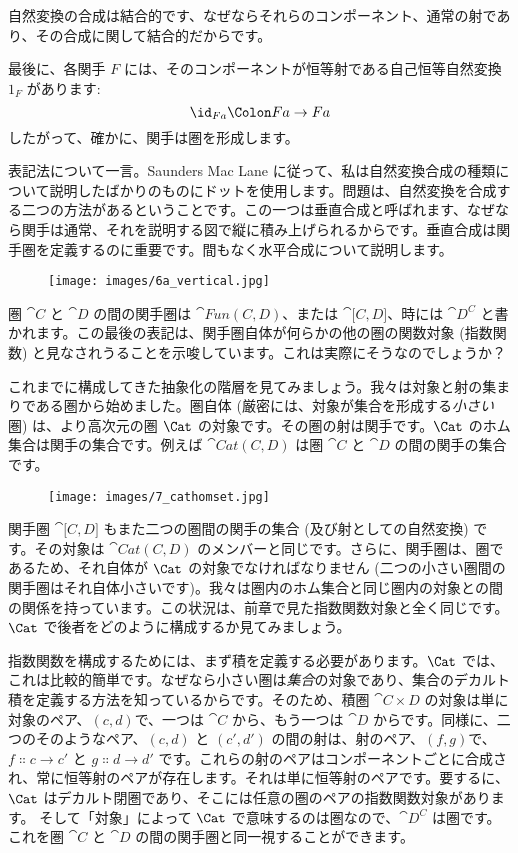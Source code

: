\noindent
自然変換の合成は結合的です、なぜならそれらのコンポーネント、通常の射であり、その合成に関して結合的だからです。

最後に、各関手 $F$ には、そのコンポーネントが恒等射である自己恒等自然変換 $1_F$ があります: 
\[\id_{F a} \Colon F a \to F a\]
したがって、確かに、関手は圏を形成します。

表記法について一言。Saunders Mac Lane に従って、私は自然変換合成の種類について説明したばかりのものにドットを使用します。問題は、自然変換を合成する二つの方法があるということです。この一つは垂直合成と呼ばれます、なぜなら関手は通常、それを説明する図で縦に積み上げられるからです。垂直合成は関手圏を定義するのに重要です。間もなく水平合成について説明します。

\begin{figure}[H]
  \centering
  \texttt{[image: images/6a\_vertical.jpg]}
\end{figure}

\noindent
圏 $\cat{C}$ と $\cat{D}$ の間の関手圏は $\cat{Fun(C, D)}$、または $\cat{{[}C, D{]}}$、時には $\cat{D^C}$ と書かれます。この最後の表記は、関手圏自体が何らかの他の圏の関数対象 (指数関数) と見なされうることを示唆しています。これは実際にそうなのでしょうか？

これまでに構成してきた抽象化の階層を見てみましょう。我々は対象と射の集まりである圏から始めました。圏自体 (厳密には、対象が集合を形成する\emph{小さい}圏) は、より高次元の圏 $\Cat$ の対象です。その圏の射は関手です。$\Cat$ のホム集合は関手の集合です。例えば $\cat{Cat(C, D)}$ は圏 $\cat{C}$ と $\cat{D}$ の間の関手の集合です。

\begin{figure}[H]
  \centering
  \texttt{[image: images/7\_cathomset.jpg]}
\end{figure}

\noindent
関手圏 $\cat{{[}C, D{]}}$ もまた二つの圏間の関手の集合 (及び射としての自然変換) です。その対象は $\cat{Cat(C, D)}$ のメンバーと同じです。さらに、関手圏は、圏であるため、それ自体が $\Cat$ の対象でなければなりません (二つの小さい圏間の関手圏はそれ自体小さいです)。我々は圏内のホム集合と同じ圏内の対象との間の関係を持っています。この状況は、前章で見た指数関数対象と全く同じです。$\Cat$ で後者をどのように構成するか見てみましょう。

指数関数を構成するためには、まず積を定義する必要があります。$\Cat$ では、これは比較的簡単です。なぜなら小さい圏は\emph{集合}の対象であり、集合のデカルト積を定義する方法を知っているからです。そのため、積圏 $\cat{C\times D}$ の対象は単に対象のペア、$(c, d)$で、一つは $\cat{C}$ から、もう一つは $\cat{D}$ からです。同様に、二つのそのようなペア、$(c, d)$ と $(c', d')$ の間の射は、射のペア、$(f, g)$で、$f \Colon c \to c'$ と $g \Colon d \to d'$ です。これらの射のペアはコンポーネントごとに合成され、常に恒等射のペアが存在します。それは単に恒等射のペアです。要するに、$\Cat$ はデカルト閉圏であり、そこには任意の圏のペアの指数関数対象があります。
そして「対象」によって $\Cat$ で意味するのは圏なので、$\cat{D^C}$ は圏です。これを圏 $\cat{C}$ と $\cat{D}$ の間の関手圏と同一視することができます。

